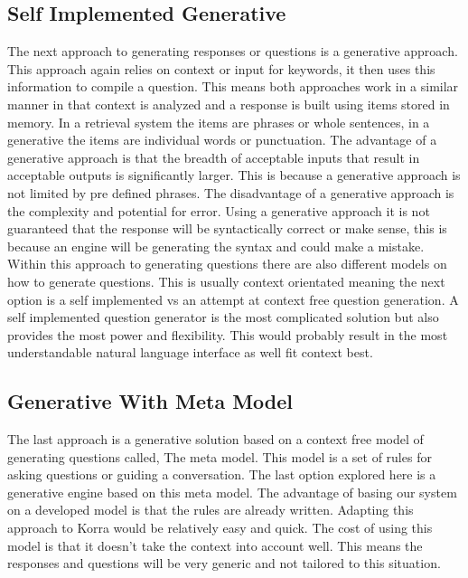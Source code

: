 \documentclass[onecolumn, draftclsnofoot,10pt, compsoc]{IEEEtran}
\begin{document}
    \subsection{Self Implemented Generative}
    The next approach to generating responses or questions is a generative approach. 
    This approach again relies on context or input for keywords, it then uses this information to compile a question.
    This means both approaches work in a similar manner in that context is analyzed and a response is built using items stored in memory.
    In a retrieval system the items are phrases or whole sentences, in a generative the items are individual words or punctuation.
    The advantage of a generative approach is that the breadth of acceptable inputs that result in acceptable outputs is significantly larger.
    This is because a generative approach is not limited by pre defined phrases.
    The disadvantage of a generative approach is the complexity and potential for error.
    Using a generative approach it is not guaranteed that the response will be syntactically correct or make sense, this is because an engine will be generating the syntax and could make a mistake.
    Within this approach to generating questions there are also different models on how to generate questions.
    This is usually context orientated meaning the next option is a self implemented vs an attempt at context free question generation.
    A self implemented question generator is the most complicated solution but also provides the most power and flexibility.
    This would probably result in the most understandable natural language interface as well fit context best.
    
    \subsection{Generative With Meta Model}
    The last approach is a generative solution based on a context free model of generating questions called, The meta model. 
    This model is a set of rules for asking questions or guiding a conversation. 
    The last option explored here is a generative engine based on this meta model.
    The advantage of basing our system on a developed model is that the rules are already written.
    Adapting this approach to Korra would be relatively easy and quick.
    The cost of using this model is that it doesn't take the context into account well.
    This means the responses and questions will be very generic and not tailored to this situation.
    
\end{document}
